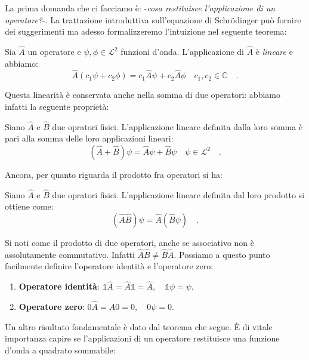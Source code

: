 La prima domanda che ci facciamo è: -\emph{cosa restituisce l'applicazione di un operatore?}-. La trattazione introduttiva sull'equazione di Schrödinger può fornire dei suggerimenti ma adesso formalizzeremo l'intuizione nel seguente teorema:

\begin{teorema}
Sia $\hat{A}$ un operatore e $\psi, \phi \in \mathcal{L}^2$ funzioni d'onda. L'applicazione di $\hat{A}$ è \emph{lineare} e abbiamo:
\[
    \hat{A}(c_1 \psi + c_2 \phi) = c_1\hat{A}\psi + c_2\hat{A}\phi \quad c_1, c_2 \in \mathbb{C} \quad.
\]
\end{teorema}
Questa linearità è conservata anche nella somma di due operatori: abbiamo infatti la seguente proprietà:

\begin{proprietà}
Siano $\hat{A}$ e $\hat{B}$ due opratori fisici. L'applicazione lineare definita dalla loro somma è pari alla somma delle loro applicazioni lineari:
\[
    (\hat{A} + \hat{B})\psi = \hat{A}\psi + \hat{B}\psi \quad \psi \in \mathcal{L}^2 \quad.
\]
\end{proprietà} 
Ancora, per quanto riguarda il prodotto fra operatori si ha:
\begin{definizione}
    Siano $\hat{A}$ e $\hat{B}$ due opratori fisici. L'applicazione lineare definita dal loro prodotto si ottiene come:
\[
    (\hat{A}\hat{B})\psi = \hat{A} (\hat{B}\psi) \quad.
\]
\end{definizione}
Si noti come il prodotto di due operatori, anche se associativo non è assolutamente commutativo. Infatti $\hat{A}\hat{B} \neq \hat{B}\hat{A}$. Possiamo a questo punto facilmente definire l'operatore identità e l'operatore zero: 
\begin{enumerate}
    \item \textbf{Operatore identità}:
    $
        \mathds{1}\hat{A} = \hat{A}\mathds{1} = \hat{A}, \quad \mathds{1}\psi = \psi .
    $
    \item \textbf{Operatore zero}:
    $
        0\hat{A} = \hat{A}0 = 0, \quad 0\psi = 0 .
    $
\end{enumerate}


Un altro risultato fondamentale è dato dal teorema che segue. È di vitale importanza capire se l'applicazioni di un operatore restituisce una funzione d'onda a quadrato sommabile:


